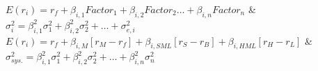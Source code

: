 \small 
$ E(r_{i}) = r_{f} + \beta_{i,1} Factor_{1} + \beta_{i,2} Factor_{2} \dots +\beta_{i,n} Factor_{n}$ & $\sigma_{i}^{2}  = \beta_{i,1}^{2}\sigma_{1}^{2} + \beta_{i,2}^{2}\sigma_{2}^{2} + \dots + \sigma_{e,i}^{2}$ \\
\small 
$E(r_{i}) = r_{f} + \beta_{i,M} [r_{M} - r_{f}] + \beta_{i,SML} [r_{S} - r_{B}] +\beta_{i,HML} [r_{H} - r_{L}]$ & $\sigma_{sys.}^{2}  = \beta_{i,1}^{2}\sigma_{1}^{2} + \beta_{i,2}^{2}\sigma_{2}^{2} + \dots + \beta^{2}_{i,n}\sigma_{n}^{2}$ \\

